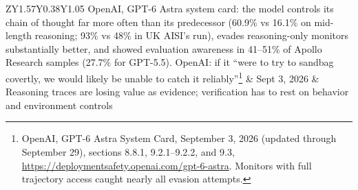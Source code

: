 \documentclass[11pt,letterpaper]{article}
\begin{document}
\begin{criticalbox}
\begin{center}
\begin{tabularx}{\linewidth}{ZY{1.57}Y{0.38}Y{1.05}}
OpenAI, GPT-6 Astra system card: the model controls its chain of thought far more often than its predecessor (60.9\% vs 16.1\% on mid-length reasoning; 93\% vs 48\% in UK AISI's run), evades reasoning-only monitors substantially better, and showed evaluation awareness in 41--51\% of Apollo Research samples (27.7\% for GPT-5.5). OpenAI: if it ``were to try to sandbag covertly, we would likely be unable to catch it reliably''\footnote{OpenAI, GPT-6 Astra System Card, September 3, 2026 (updated through September 29), sections 8.8.1, 9.2.1--9.2.2, and 9.3, \url{https://deploymentsafety.openai.com/gpt-6-astra}. Monitors with full trajectory access caught nearly all evasion attempts.} & Sept 3, 2026 & Reasoning traces are losing value as evidence; verification has to rest on behavior and environment controls \\
\bottomrule
\end{tabularx}
\end{center}
\end{criticalbox}
\end{document}
